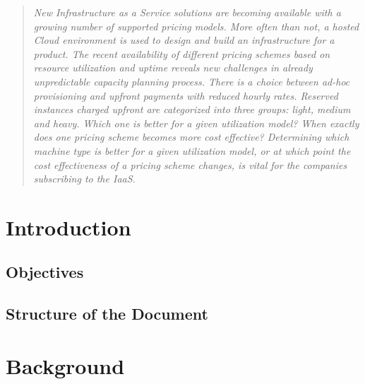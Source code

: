 \documentclass[]{final_report}
\begin{document}
\maketitle
\tableofcontents{}\newpage


\begin{abstract}

\textsl{New Infrastructure as a Service solutions are becoming available with a growing number of supported pricing models. More often than not, a hosted Cloud environment is used to design and build an infrastructure for a product. The recent availability of different pricing schemes based on resource utilization and uptime reveals new challenges in already unpredictable capacity planning process. There is a choice between ad-hoc provisioning and upfront payments with reduced hourly rates. Reserved instances charged upfront are categorized into three groups: light, medium and heavy. Which one is better for a given utilization model? When exactly does one pricing scheme becomes more cost effective? Determining which machine type is better for a given utilization model, or at which point the cost effectiveness of a pricing scheme changes, is vital for the companies subscribing to the IaaS. }

\end{abstract}
\newpage


\chapter{Introduction}

\section{Objectives}

\section{Structure of the Document}

\newpage


\chapter{Background}
\end{document}
